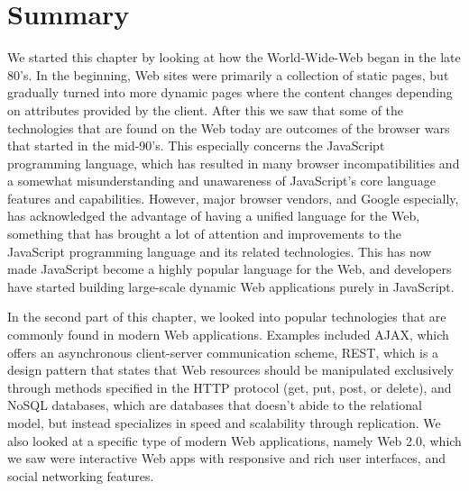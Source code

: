 \section{Summary}
We started this chapter by looking at how the World-Wide-Web began in the late 80's. In the beginning, Web sites were primarily a collection of static pages, but gradually turned into more dynamic pages where the content changes depending on attributes provided by the client. After this we saw that some of the technologies that are found on the Web today are outcomes of the browser wars that started in the mid-90's. This especially concerns the JavaScript programming language, which has resulted in many browser incompatibilities and a somewhat misunderstanding and unawareness of JavaScript's core language features and capabilities. However, major browser vendors, and Google especially, has acknowledged the advantage of having a unified language for the Web, something that has brought a lot of attention and improvements to the JavaScript programming language and its related technologies. This has now made JavaScript become a highly popular language for the Web, and developers have started building large-scale dynamic Web applications purely in JavaScript.

In the second part of this chapter, we looked into popular technologies that are commonly found in modern Web applications. Examples included AJAX, which offers an asynchronous client-server communication scheme, REST, which is a design pattern that states that Web resources should be manipulated exclusively through methods specified in the HTTP protocol (get, put, post, or delete), and NoSQL databases, which are databases that doesn't abide to the relational model, but instead specializes in speed and scalability through replication. We also looked at a specific type of modern Web applications, namely Web 2.0, which we saw were interactive Web apps with responsive and rich user interfaces, and social networking features.  

   
